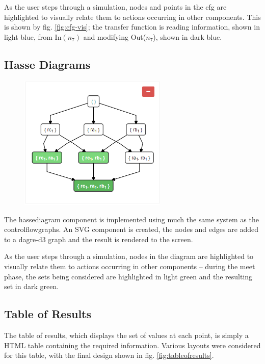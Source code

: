 \documentclass[bsc,twoside,singlespacing,parskip,logo,notimes,normalheadings]{infthesis}
\begin{document}
        As the user steps through a simulation, nodes and points in
        the \gls{cfg} are highlighted to visually relate them to
        actions occurring in other components. This is shown by
        fig. \ref{fig:cfg-vis}; the transfer function is reading
        information, shown in light blue, from In$(n_7)$ and modifying
        Out($n_7$), shown in dark blue.

        \subsection{Hasse Diagrams}\label{sec:impl-visual-hasse}

        \begin{figure}
          \centering
          \includegraphics[width=7cm, trim=0 0 0 60]{img/lattice.png}
          \captionsetup{width=6cm, justification=centering}
          \label{fig:lattice}
        \end{figure}

        The \gls{hassediagram} component is implemented using much the
        same system as the \gls{controlflowgraph}s. An SVG component
        is created, the nodes and edges are added to a dagre-d3 graph
        and the result is rendered to the screen.

        As the user steps through a simulation, nodes in the diagram
        are highlighted to visually relate them to actions occurring
        in other components -- during the meet phase, the sets being
        considered are highlighted in light green and the resulting
        set in dark green.

        \subsection{Table of Results}\label{sec:impl-visual-results}
        The table of results, which displays the set of values at each
        point, is simply a HTML table containing the required
        information. Various layouts were considered for this table,
        with the final design shown in fig. \ref{fig:tableofresults}.
\end{document}
